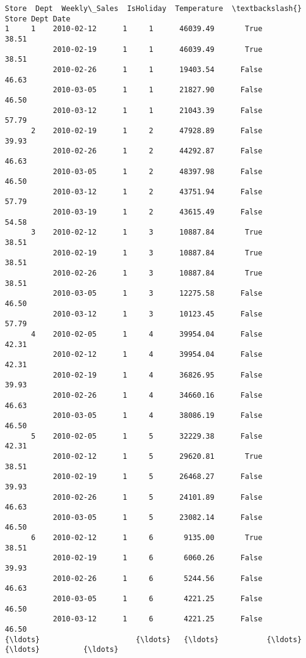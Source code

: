 \documentclass[11pt]{article}
\begin{document}
    \begin{Verbatim}[commandchars=\\\{\}]
                       Store  Dept  Weekly\_Sales  IsHoliday  Temperature  \textbackslash{}
Store Dept Date                                                            
1     1    2010-02-12      1     1      46039.49       True        38.51   
           2010-02-19      1     1      46039.49       True        38.51   
           2010-02-26      1     1      19403.54      False        46.63   
           2010-03-05      1     1      21827.90      False        46.50   
           2010-03-12      1     1      21043.39      False        57.79   
      2    2010-02-19      1     2      47928.89      False        39.93   
           2010-02-26      1     2      44292.87      False        46.63   
           2010-03-05      1     2      48397.98      False        46.50   
           2010-03-12      1     2      43751.94      False        57.79   
           2010-03-19      1     2      43615.49      False        54.58   
      3    2010-02-12      1     3      10887.84       True        38.51   
           2010-02-19      1     3      10887.84       True        38.51   
           2010-02-26      1     3      10887.84       True        38.51   
           2010-03-05      1     3      12275.58      False        46.50   
           2010-03-12      1     3      10123.45      False        57.79   
      4    2010-02-05      1     4      39954.04      False        42.31   
           2010-02-12      1     4      39954.04      False        42.31   
           2010-02-19      1     4      36826.95      False        39.93   
           2010-02-26      1     4      34660.16      False        46.63   
           2010-03-05      1     4      38086.19      False        46.50   
      5    2010-02-05      1     5      32229.38      False        42.31   
           2010-02-12      1     5      29620.81       True        38.51   
           2010-02-19      1     5      26468.27      False        39.93   
           2010-02-26      1     5      24101.89      False        46.63   
           2010-03-05      1     5      23082.14      False        46.50   
      6    2010-02-12      1     6       9135.00       True        38.51   
           2010-02-19      1     6       6060.26      False        39.93   
           2010-02-26      1     6       5244.56      False        46.63   
           2010-03-05      1     6       4221.25      False        46.50   
           2010-03-12      1     6       4221.25      False        46.50   
{\ldots}                      {\ldots}   {\ldots}           {\ldots}        {\ldots}          {\ldots}   

\end{Verbatim}
\end{document}
